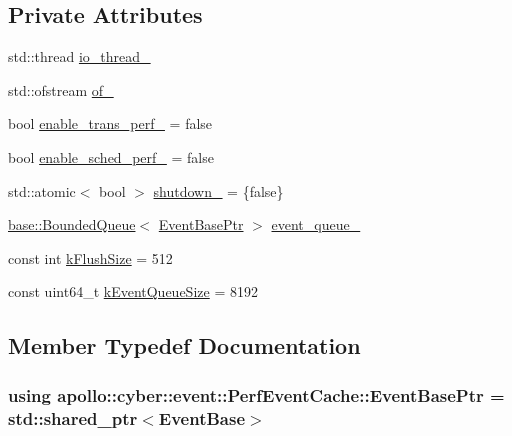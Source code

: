 \subsection*{Private Attributes}
\begin{DoxyCompactItemize}
\item 
std\-::thread \hyperlink{classapollo_1_1cyber_1_1event_1_1PerfEventCache_a72da8ae6b3a52a0533c5df4398f7463a}{io\-\_\-thread\-\_\-}
\item 
std\-::ofstream \hyperlink{classapollo_1_1cyber_1_1event_1_1PerfEventCache_ad190a19395906ca0eede7b1526b64964}{of\-\_\-}
\item 
bool \hyperlink{classapollo_1_1cyber_1_1event_1_1PerfEventCache_a91a46c1094cff4af13c2af59c884ccbc}{enable\-\_\-trans\-\_\-perf\-\_\-} = false
\item 
bool \hyperlink{classapollo_1_1cyber_1_1event_1_1PerfEventCache_af4b2ddc5105d2d75a2aca49a219bced4}{enable\-\_\-sched\-\_\-perf\-\_\-} = false
\item 
std\-::atomic$<$ bool $>$ \hyperlink{classapollo_1_1cyber_1_1event_1_1PerfEventCache_a4f064542c80809a3d11e8d274e01a0f2}{shutdown\-\_\-} = \{false\}
\item 
\hyperlink{classapollo_1_1cyber_1_1base_1_1BoundedQueue}{base\-::\-Bounded\-Queue}$<$ \hyperlink{classapollo_1_1cyber_1_1event_1_1PerfEventCache_a97c9a532fd89d72c664547eba0f39525}{Event\-Base\-Ptr} $>$ \hyperlink{classapollo_1_1cyber_1_1event_1_1PerfEventCache_a0c19917b6624f25f5519d3d3383bcdf7}{event\-\_\-queue\-\_\-}
\item 
const int \hyperlink{classapollo_1_1cyber_1_1event_1_1PerfEventCache_a3eededccf54705415c8bde9035aa21f0}{k\-Flush\-Size} = 512
\item 
const uint64\-\_\-t \hyperlink{classapollo_1_1cyber_1_1event_1_1PerfEventCache_a2722b97e9e3d6712ffca9cee99b6fe22}{k\-Event\-Queue\-Size} = 8192
\end{DoxyCompactItemize}


\subsection{Member Typedef Documentation}
\hypertarget{classapollo_1_1cyber_1_1event_1_1PerfEventCache_a97c9a532fd89d72c664547eba0f39525}{
\subsubsection[{Event\-Base\-Ptr}]{\setlength{\rightskip}{0pt plus 5cm}using {\bf apollo\-::cyber\-::event\-::\-Perf\-Event\-Cache\-::\-Event\-Base\-Ptr} =  std\-::shared\-\_\-ptr$<${\bf Event\-Base}$>$}}\label{classapollo_1_1cyber_1_1event_1_1PerfEventCache_a97c9a532fd89d72c664547eba0f39525}



